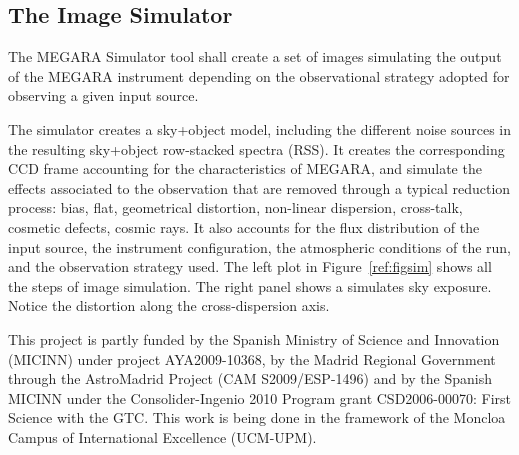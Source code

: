 \documentclass[11pt,twoside]{article}
\begin{document}
\subsection{The Image Simulator}

The MEGARA Simulator tool shall create a set of images simulating the output of the
MEGARA instrument depending on the observational strategy adopted for observing a given input source. 

The simulator creates a sky+object model, including the different noise sources in the resulting sky+object row-stacked spectra (RSS). It creates the corresponding CCD frame accounting for the characteristics of MEGARA, and simulate the effects associated to the observation that are removed through a typical reduction process: bias, flat, geometrical distortion, non-linear  dispersion, cross-talk, cosmetic defects, cosmic rays. It also accounts for the flux distribution of the input source, the instrument configuration, the atmospheric conditions of the run, and the observation strategy used. 
The left plot in Figure~\ref{ref:figsim} shows all the steps of image simulation. The right panel shows a simulates sky exposure. Notice the
distortion along the cross-dispersion axis.


\acknowledgements This project is partly funded by the Spanish Ministry of Science and Innovation (MICINN) under project
AYA2009-10368, by the Madrid Regional Government through the AstroMadrid Project (CAM S2009/ESP-1496) and by the Spanish MICINN 
under the Consolider-Ingenio 2010 Program grant CSD2006-00070: First Science with the GTC. 
This work is being done in the framework of the Moncloa Campus of International Excellence (UCM-UPM).
\end{document}
